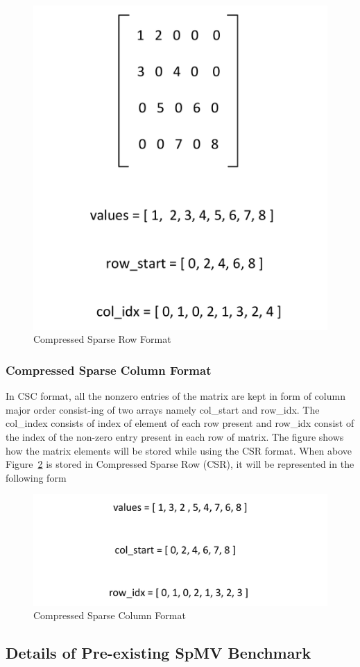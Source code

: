 \begin{figure}
	\centering
	\includegraphics[width=.4\textwidth]{images/csr.pdf}
	\caption{Compressed Sparse Row Format}
	\label{aa:100}
\end{figure}

\subsubsection{Compressed Sparse Column Format}

In CSC format, all the nonzero entries of the matrix are kept in form of column major order consist-ing of two arrays namely col\_start and row\_idx. The col\_index consists of index of element of each row present and row\_idx consist of the index of the non-zero entry present in each row of matrix. The figure shows how the matrix elements will be stored while using the CSR format. When above Figure~\ref{aaa:1000} is stored in Compressed Sparse Row (CSR), it will be represented in the following form

\begin{figure}
	\centering
	\includegraphics[width=.6\textwidth]{images/csc.pdf}
	\caption{Compressed Sparse Column Format}
	\label{aaa:1000}
\end{figure}

\subsection{Details of Pre-existing SpMV Benchmark}

